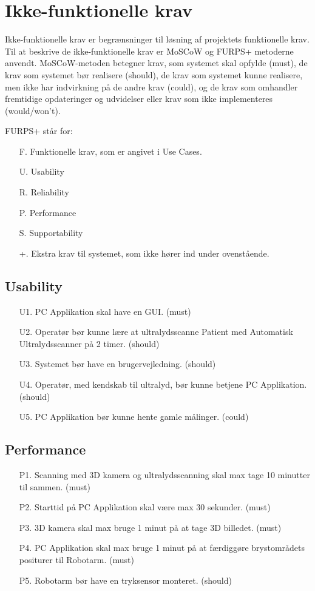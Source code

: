 \chapter{Ikke-funktionelle krav}\label{Ikkefunktionellekrav}

Ikke-funktionelle krav er begrænsninger til løsning af projektets funktionelle krav. Til at beskrive de ikke-funktionelle krav er MoSCoW og FURPS+ metoderne anvendt. 
MoSCoW-metoden betegner krav, som systemet skal opfylde (must), de krav som systemet bør realisere (should), de krav som systemet kunne realisere, men ikke har indvirkning på de andre krav (could), og de krav som omhandler fremtidige opdateringer og udvidelser eller krav som ikke implementeres  (would/won't).
  
FURPS+ står for:
\begin{enumerate}
\item[F.] Funktionelle krav, som er angivet i Use Cases.
\item[U.] Usability
\item[R.] Reliability
\item[P.] Performance 
\item[S.] Supportability 
\item[+.] Ekstra krav til systemet, som ikke hører ind under ovenstående. 
\end{enumerate}

\section{Usability}
\begin{enumerate}
    \item[U1.] PC Applikation skal have en GUI. (must)
    \item[U2.] Operatør bør kunne lære at ultralydsscanne Patient med Automatisk Ultralydsscanner på 2 timer. (should)
    \item[U3.] Systemet bør have en brugervejledning.  (should)  
    \item[U4.] Operatør, med kendskab til ultralyd, bør kunne betjene PC Applikation. (should)
    \item[U5.] PC Applikation bør kunne hente gamle målinger. (could)
\end{enumerate}

\section{Performance}
\begin{enumerate}
    \item[P1.] Scanning med 3D kamera og ultralydsscanning skal max tage 10 minutter til sammen. (must) 
    \item[P2.] Starttid på PC Applikation skal være max 30 sekunder. (must)
    \item[P3.] 3D kamera skal max bruge 1 minut på at tage 3D billedet. (must)
    \item[P4.] PC Applikation skal max bruge 1 minut på at færdiggøre brystområdets positurer til Robotarm. (must)
    \item[P5.] Robotarm bør have en tryksensor monteret. (should)
\end{enumerate}

